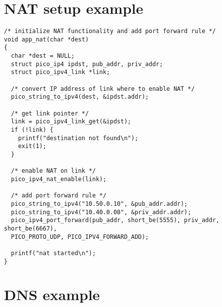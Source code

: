 \section{NAT setup example}

\begin{verbatim}
/* initialize NAT functionality and add port forward rule */
void app_nat(char *dest)
{
  char *dest = NULL;
  struct pico_ip4 ipdst, pub_addr, priv_addr;
  struct pico_ipv4_link *link;

  /* convert IP address of link where to enable NAT */
  pico_string_to_ipv4(dest, &ipdst.addr);
  
  /* get link pointer */
  link = pico_ipv4_link_get(&ipdst);
  if (!link) {
    printf("destination not found\n");
    exit(1);
  }
  
  /* enable NAT on link */
  pico_ipv4_nat_enable(link);
  
  /* add port forward rule */
  pico_string_to_ipv4("10.50.0.10", &pub_addr.addr);
  pico_string_to_ipv4("10.40.0.08", &priv_addr.addr);
  pico_ipv4_port_forward(pub_addr, short_be(5555), priv_addr, short_be(6667),
  PICO_PROTO_UDP, PICO_IPV4_FORWARD_ADD);
  
  printf("nat started\n");
}
\end{verbatim}


\section{DNS example}

